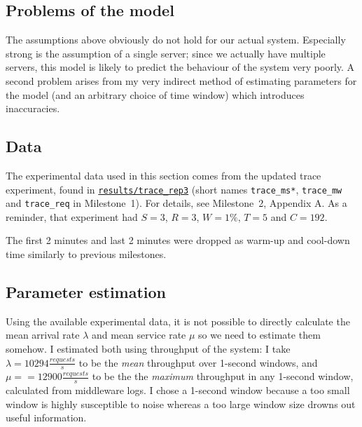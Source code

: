 \documentclass[11pt]{article}
\begin{document}
\subsection{Problems of the model}
The assumptions above obviously do not hold for our actual system. Especially strong is the assumption of a single server; since we actually have multiple servers, this model is likely to predict the behaviour of the system very poorly. A second problem arises from my very indirect method of estimating parameters for the model (and an arbitrary choice of time window) which introduces inaccuracies.


\subsection{Data}

The experimental data used in this section comes from the updated trace experiment, found in \texttt{\href{https://gitlab.inf.ethz.ch/pungast/asl-fall16-project/tree/master/results/trace\_rep3}{results/trace\_rep3}} (short names \texttt{trace\_ms*}, \texttt{trace\_mw} and \texttt{trace\_req} in Milestone~1). For details, see Milestone~2, Appendix A. As a reminder, that experiment had $S=3$, $R=3$, $W=1\%$, $T=5$ and $C=192$.

The first 2 minutes and last 2 minutes were dropped as warm-up and cool-down time similarly to previous milestones.
 
\subsection{Parameter estimation}

Using the available experimental data, it is not possible to directly calculate the mean arrival rate $\lambda$ and mean service rate $\mu$ so we need to estimate them somehow. I estimated both using throughput of the system: I take $\lambda = 10294 \frac{requests}{s}$ to be the \emph{mean} throughput over 1-second windows, and $\mu =  = 12900 \frac{requests}{s}$ to be the the \emph{maximum} throughput in any 1-second window, calculated from middleware logs. I chose a 1-second window because a too small window is highly susceptible to noise whereas a too large window size drowns out useful information.

\end{document}

